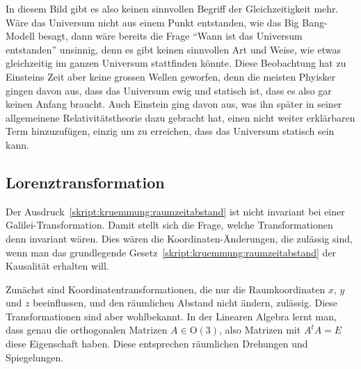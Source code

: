 In diesem Bild gibt es also keinen sinnvollen Begriff der Gleichzeitigkeit
mehr.
Wäre das Universum nicht aus einem Punkt entstanden, wie das Big Bang-Modell
besagt, dann wäre bereits die Frage ``Wann ist das Universum entstanden''
unsinnig, denn es gibt keinen sinnvollen Art und Weise, wie etwas gleichzeitig
im ganzen Universum stattfinden könnte.
Diese Beobachtung hat zu Einsteins Zeit aber keine grossen Wellen
geworfen, denn die meisten Phyisker gingen davon aus, dass das Universum
ewig und statisch ist, dass es also gar keinen Anfang braucht.
Auch Einstein ging davon aus, was ihn später in seiner allgemeinene
Relativitätstheorie dazu gebracht hat, einen nicht weiter erklärbaren
Term hinzuzufügen, einzig um zu erreichen, dass das Universum statisch 
sein kann.

\subsection{Lorenztransformation}
Der Ausdruck~\eqref{skript:kruemmung:raumzeitabstand} ist nicht
invariant bei einer Galilei-Transformation.
Damit stellt sich die Frage, welche Transformationen denn
invariant wären.
Dies wären die Koordinaten-Änderungen, die zulässig sind, wenn
man das grundlegende Gesetz~\eqref{skript:kruemmung:raumzeitabstand}
der Kausalität erhalten will.

Zunächst sind Koordinatentransformationen, die nur die Raumkoordinaten
$x$, $y$ und $z$ beeinflussen, und den räumlichen Abstand nicht
ändern, zulässig.
Diese Transformationen sind aber wohlbekannt.
In der Linearen Algebra lernt man, dass genau die orthogonalen
Matrizen $A\in \textrm{O}(3)$, also Matrizen mit $A^tA=E$ diese
Eigenschaft haben.
Diese entsprechen räumlichen Drehungen und Spiegelungen.


